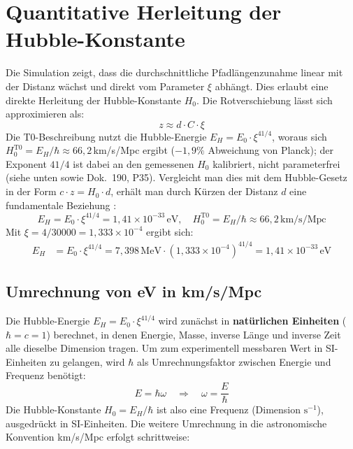 	\section{Quantitative Herleitung der Hubble-Konstante}
	Die Simulation zeigt, dass die durchschnittliche Pfadlängenzunahme linear mit der Distanz wächst und direkt vom Parameter $\xi$ abhängt. Dies erlaubt eine direkte Herleitung der Hubble-Konstante $H_0$.
	Die Rotverschiebung lässt sich approximieren als:
	\begin{equation}
		z \approx d \cdot C \cdot \xi
	\end{equation}
	Die T0-Beschreibung nutzt die Hubble-Energie $E_H = E_0 \cdot \xi^{41/4}$, woraus sich $H_0^{\text{T0}} = E_H/\hbar \approx 66{,}2\,$km/s/Mpc ergibt ($-1{,}9\%$ Abweichung von Planck); der Exponent $41/4$ ist dabei an den gemessenen $H_0$ kalibriert, nicht parameterfrei (siehe unten sowie Dok.~190, P35).
	Vergleicht man dies mit dem Hubble-Gesetz in der Form $c \cdot z = H_0 \cdot d$, erhält man durch Kürzen der Distanz $d$ eine fundamentale Beziehung \cite{pascher:geometric_formalism}:
	\begin{equation}
		E_H = E_0 \cdot \xi^{41/4} = 1{,}41 \times 10^{-33}\,\text{eV}, \quad H_0^{\text{T0}} = E_H/\hbar \approx 66{,}2\,\text{km/s/Mpc}
	\end{equation}
	Mit $\xi = 4/30000 = 1{,}333 \times 10^{-4}$ ergibt sich:
	\begin{align*}
		E_H &= E_0 \cdot \xi^{41/4} = 7{,}398\,\text{MeV} \cdot (1{,}333 \times 10^{-4})^{41/4} = 1{,}41 \times 10^{-33}\,\text{eV}
	\end{align*}
	
	\subsection{Umrechnung von eV in km/s/Mpc}
	
	Die Hubble-Energie $E_H = E_0 \cdot \xi^{41/4}$ wird zunächst in \textbf{natürlichen Einheiten} ($\hbar = c = 1$) berechnet, in denen Energie, Masse, inverse Länge und inverse Zeit alle dieselbe Dimension tragen. Um zum experimentell messbaren Wert in SI-Einheiten zu gelangen, wird $\hbar$ als Umrechnungsfaktor zwischen Energie und Frequenz benötigt:
	\begin{equation}
		E = \hbar \omega \quad \Longrightarrow \quad \omega = \frac{E}{\hbar}
	\end{equation}
	Die Hubble-Konstante $H_0 = E_H/\hbar$ ist also eine Frequenz (Dimension $\text{s}^{-1}$), ausgedrückt in SI-Einheiten. Die weitere Umrechnung in die astronomische Konvention km/s/Mpc erfolgt schrittweise:
	
